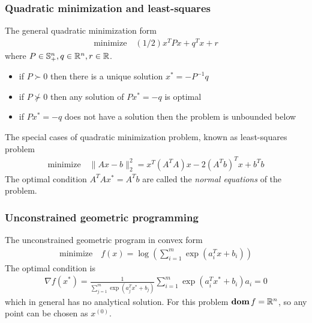 \subsubsection{Quadratic minimization and least-squares}
The general quadratic minimization form
\begin{align}
  \text{minimize}\quad (1/2)x^TPx+q^Tx+r\label{eq:9.4}
\end{align}
where $P\in\mathbb{S}_{+}^n,q\in\mathbb{R}^n,r\in\mathbb{R}$.
\begin{itemize}
  \item if $P\succ 0$ then there is a unique solution $x^\ast=-P^{-1}q$
  \item if $P\nsucc 0$ then any solution of $Px^\ast=-q$ is optimal
  \item if $Px^\ast=-q$ does not have a solution then the problem is unbounded below
\end{itemize}
The special cases of quadratic minimization problem, known as least-squares problem
\begin{align*}
  \text{minimize}\quad \|Ax-b\|_2^2=x^T(A^TA)x-2(A^Tb)^Tx+b^Tb
\end{align*}
The optimal condition $A^TAx^\ast=A^Tb$ are called the \textit{normal equations} of the problem.

\subsubsection{Unconstrained geometric programming}
The unconstrained geometric program in convex form
\begin{align*}
  \text{minimize}\quad f(x)=\log\left(\sum_{i=1}^m\exp(a_i^Tx+b_i)\right)
\end{align*}
The optimal condition is
\begin{align*}
  \nabla f(x^\ast)=\frac{1}{\sum_{j=1}^m\exp(a_j^Tx^\ast+b_j)}\sum_{i=1}^m\exp(a_i^Tx^\ast+b_i)a_i=0
\end{align*}
which in general has no analytical solution. For this problem $\mathop{\bf dom} f=\mathbb{R}^n$, so any point can be chosen as $x^{(0)}$.


